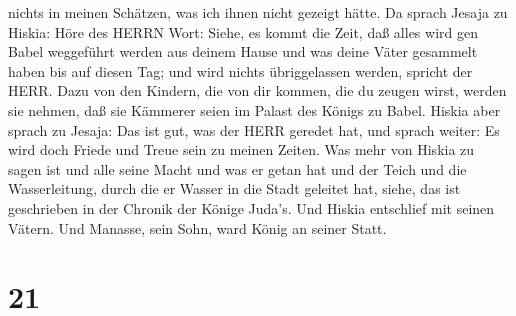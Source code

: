 nichts in meinen Schätzen, was ich ihnen nicht gezeigt hätte.
 Da sprach Jesaja zu Hiskia: Höre des HERRN Wort:
 Siehe, es kommt die Zeit, daß alles wird gen Babel
weggeführt werden aus deinem Hause und was deine Väter gesammelt haben
bis auf diesen Tag; und wird nichts übriggelassen werden, spricht der
HERR.  Dazu von den Kindern, die von dir kommen, die du
zeugen wirst, werden sie nehmen, daß sie Kämmerer seien im Palast des
Königs zu Babel.  Hiskia aber sprach zu Jesaja: Das ist
gut, was der HERR geredet hat, und sprach weiter: Es wird doch Friede
und Treue sein zu meinen Zeiten.  Was mehr von Hiskia zu
sagen ist und alle seine Macht und was er getan hat und der Teich und
die Wasserleitung, durch die er Wasser in die Stadt geleitet hat, siehe,
das ist geschrieben in der Chronik der Könige Juda's.  Und
Hiskia entschlief mit seinen Vätern. Und Manasse, sein Sohn, ward König
an seiner Statt.

\hypertarget{section-20}{%
\section{21}\label{section-20}}

